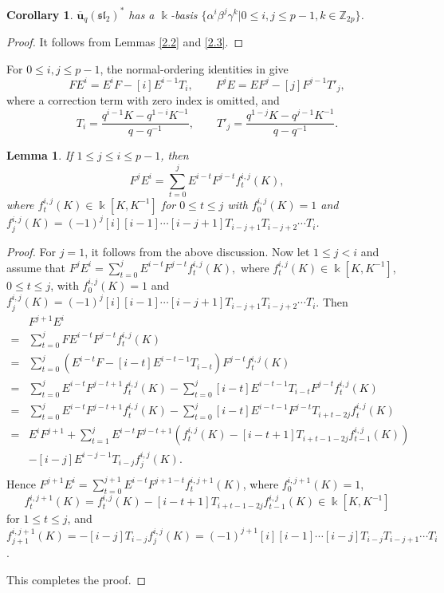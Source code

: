 \documentclass[10pt,oneside]{amsart}
\newtheorem{lemma}[proposition]{Lemma}
\newtheorem{corollary}[proposition]{Corollary}
\theoremstyle{definition}
\def\<{\leqslant}
\def\a{\alpha}
\def\b{\beta}
\def\g{\gamma}
\begin{document}
\begin{corollary}\label{2.4}
$\mathbf{\overline{u}}_q(\mathfrak{sl_2})^*$ has a $\Bbbk$-basis $\{\a^i\b^j\g^k|0\<i,j\<p-1, k\in \mathbb{Z}_{2p}\}$.
\end{corollary}

\begin{proof}
It follows from Lemmas \ref{2.2} and \ref{2.3}.
\end{proof}

For $0\le i,j\le p-1$, the normal-ordering identities in \cite[Lemma VI.1.3]{Ka} give
\[
 FE^i=E^iF-[i]E^{i-1}T_i,\qquad
 F^jE=EF^j-[j]F^{j-1}T'_j,
\]
where a correction term with zero index is omitted, and
\[
 T_i=\frac{q^{i-1}K-q^{1-i}K^{-1}}{q-q^{-1}},\qquad
 T'_j=\frac{q^{1-j}K-q^{j-1}K^{-1}}{q-q^{-1}}.
\]

\begin{lemma}\label{gs1}
If $1\<j\<i\<p-1$, then
$$F^jE^i=\sum_{t=0}^jE^{i-t}F^{j-t}f^{i,j}_t(K),$$ where $f^{i,j}_t(K)\in \Bbbk[ K,K^{-1}]$ for $0\<t\<j$ with $f^{i,j}_0(K)=1$ and $f^{i,j}_j(K)=(-1)^j[i][i-1]\cdots[i-j+1]T_{i-j+1}T_{i-j+2}\cdots T_i$.
\end{lemma}
\begin{proof}
 For $j=1$, it follows from the  above discussion. Now let $1\<j<i$ and assume that $F^jE^i=\sum_{t=0}^jE^{i-t}F^{j-t}f^{i,j}_t(K),$ where $f^{i,j}_t(K)\in \Bbbk[K,K^{-1}]$, $0\<t\<j$, with $f^{i,j}_0(K)=1$ and  $f^{i,j}_j(K)=(-1)^j[i][i-1]\cdots[i-j+1]T_{i-j+1}T_{i-j+2}\cdots T_i$. Then
$$\begin{array}{rl}
&F^{j+1}E^i\\
=&\sum_{t=0}^jFE^{i-t}F^{j-t}f^{i,j}_t(K)\\
=&\sum_{t=0}^j(E^{i-t}F-[i-t]E^{i-t-1}T_{i-t})F^{j-t}f^{i,j}_t(K)\\
=&\sum_{t=0}^jE^{i-t}F^{j-t+1}f^{i,j}_t(K)-\sum_{t=0}^j[i-t]E^{i-t-1}T_{i-t}F^{j-t}f^{i,j}_t(K)\\
=&\sum_{t=0}^jE^{i-t}F^{j-t+1}f^{i,j}_t(K)-\sum_{t=0}^j[i-t]E^{i-t-1}F^{j-t}T_{i+t-2j}f^{i,j}_t(K)\\
=&E^iF^{j+1}+\sum_{t=1}^jE^{i-t}F^{j-t+1}(f^{i,j}_{t}(K)-[i-t+1]T_{i+t-1-2j}f^{i,j}_{t-1}(K))\\
&-[i-j]E^{i-j-1}T_{i-j}f^{i,j}_{j}(K).\\
\end{array}$$
Hence $F^{j+1}E^i=\sum_{t=0}^{j+1}E^{i-t}F^{j+1-t}f^{i,j+1}_t(K)$, where $f^{i,j+1}_0(K)=1$,
$$f^{i,j+1}_t(K)=f^{i,j}_t(K)-[i-t+1]T_{i+t-1-2j}f^{i,j}_{t-1}(K)\in \Bbbk[K,K^{-1}]$$ for $1\<t\<j$, and $f^{i,j+1}_{j+1}(K)=-[i-j]T_{i-j}f^{i,j}_j(K)=(-1)^{j+1}[i][i-1]\cdots[i-j]T_{i-j}T_{i-j+1}\cdots T_i$.

 This completes the proof.
\end{proof}
\end{document}
